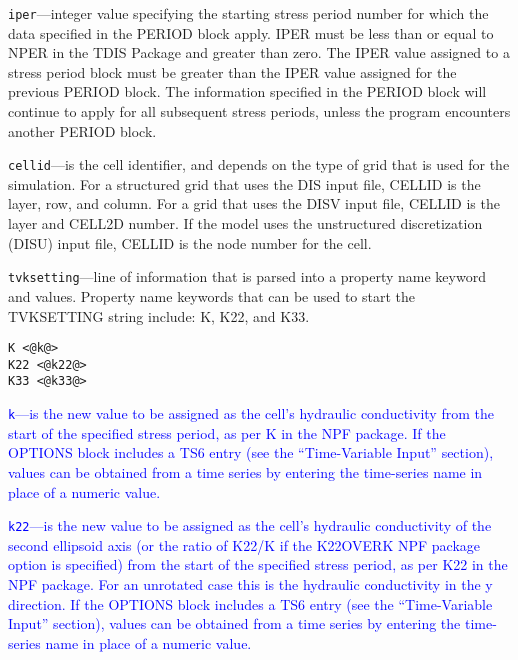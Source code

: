 \begin{description}
\item \texttt{iper}---integer value specifying the starting stress period number for which the data specified in the PERIOD block apply.  IPER must be less than or equal to NPER in the TDIS Package and greater than zero.  The IPER value assigned to a stress period block must be greater than the IPER value assigned for the previous PERIOD block.  The information specified in the PERIOD block will continue to apply for all subsequent stress periods, unless the program encounters another PERIOD block.

\item \texttt{cellid}---is the cell identifier, and depends on the type of grid that is used for the simulation.  For a structured grid that uses the DIS input file, CELLID is the layer, row, and column.   For a grid that uses the DISV input file, CELLID is the layer and CELL2D number.  If the model uses the unstructured discretization (DISU) input file, CELLID is the node number for the cell.

\item \texttt{tvksetting}---line of information that is parsed into a property name keyword and values.  Property name keywords that can be used to start the TVKSETTING string include: K, K22, and K33.

\begin{lstlisting}[style=blockdefinition]
K <@k@>
K22 <@k22@>
K33 <@k33@>
\end{lstlisting}

\item \textcolor{blue}{\texttt{k}---is the new value to be assigned as the cell's hydraulic conductivity from the start of the specified stress period, as per K in the NPF package.  If the OPTIONS block includes a TS6 entry (see the ``Time-Variable Input'' section), values can be obtained from a time series by entering the time-series name in place of a numeric value.}

\item \textcolor{blue}{\texttt{k22}---is the new value to be assigned as the cell's hydraulic conductivity of the second ellipsoid axis (or the ratio of K22/K if the K22OVERK NPF package option is specified) from the start of the specified stress period, as per K22 in the NPF package.  For an unrotated case this is the hydraulic conductivity in the y direction.  If the OPTIONS block includes a TS6 entry (see the ``Time-Variable Input'' section), values can be obtained from a time series by entering the time-series name in place of a numeric value.}


\end{description}
